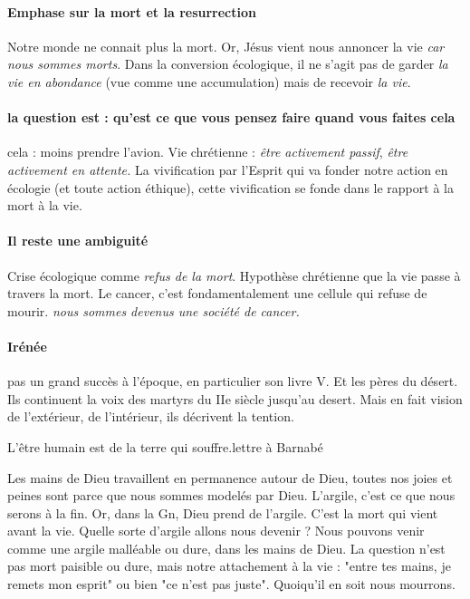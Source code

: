 \paragraph{Emphase sur la mort et la resurrection} Notre monde ne connait plus la mort. Or, Jésus vient nous annoncer la vie \textit{car nous sommes morts}. Dans la conversion écologique, il ne s'agit pas de garder \textit{la vie en abondance} (vue comme une accumulation) mais de recevoir \textit{la vie}. 

\paragraph{la question est : qu'est ce que vous pensez faire quand vous faites cela} cela : moins prendre l'avion. Vie chrétienne : \textit{être activement passif}, \textit{être activement en attente. } La vivification par l'Esprit qui va fonder notre action en écologie (et toute action éthique), cette vivification se fonde dans le rapport à la mort à la vie. 

\paragraph{Il reste une ambiguité}
Crise écologique comme \textit{refus de la mort}. Hypothèse chrétienne que la vie passe à travers la mort.
Le cancer, c'est fondamentalement une cellule qui refuse de mourir. \textit{nous sommes devenus une société de cancer.}


\paragraph{Irénée} pas un grand succès à l'époque, en particulier son livre V. Et les pères du désert. Ils continuent la voix des martyrs du IIe siècle jusqu'au desert. Mais en fait vision de l'extérieur, de l'intérieur, ils décrivent la tention. 

\begin{Def}
L'être humain est de la terre qui souffre.lettre à Barnabé
\end{Def}
Les mains de Dieu travaillent en permanence autour de Dieu, toutes nos joies et peines sont parce que nous sommes modelés par Dieu. L'argile, c'est ce que nous serons à la fin. Or, dans la Gn, Dieu prend de l'argile. C'est la mort qui vient avant la vie. Quelle sorte d'argile allons nous devenir ? Nous pouvons venir comme une argile malléable ou dure, dans les mains de Dieu. 
La question n'est pas mort paisible ou dure, mais notre attachement à la vie : "entre tes mains, je remets mon esprit" ou bien "ce n'est pas juste". Quoiqu'il en soit nous mourrons.

